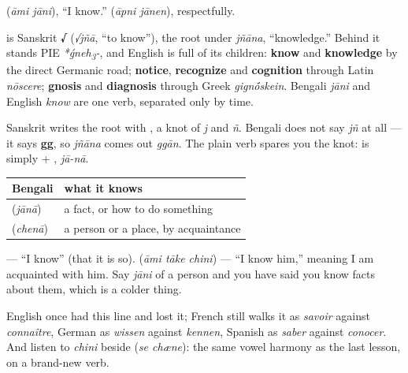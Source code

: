   (\emph{āmi jāni}), \textquotedblleft{}I know.\textquotedblright{}   (\emph{āpni jānen}), respectfully.

\begin{cousinweb}
\textbf{} is Sanskrit \textbf{√} (\emph{√jñā}, \textquotedblleft{}to know\textquotedblright{}), the root under \emph{jñāna}, \textquotedblleft{}knowledge.\textquotedblright{} Behind it stands PIE \emph{*ǵneh\textsubscript{3}-}, and English is full of its children: \textbf{know} and \textbf{knowledge} by the direct Germanic road; \textbf{notice}, \textbf{recognize} and \textbf{cognition} through Latin \emph{nōscere}; \textbf{gnosis} and \textbf{diagnosis} through Greek \emph{gign\'{\={o}}skein}. Bengali \emph{jāni} and English \emph{know} are one verb, separated only by time.
\end{cousinweb}

\begin{sounds}
Sanskrit writes the root with \textbf{}, a knot of \emph{j} and \emph{ñ}. Bengali does not say \emph{jñ} at all — it says \textbf{gg}, so \emph{jñāna} comes out \emph{ggān}. The plain verb spares you the knot: \textbf{} is simply  + , \emph{jā-nā}.
\end{sounds}

\begin{grammarlens}[title={Grammar Lens: two knowings, and English has one word for both}]
\noindent
\begin{tabularx}{\linewidth}{@{}>{\raggedright\arraybackslash}X>{\raggedright\arraybackslash}X@{}}
\toprule
\textbf{Bengali} & \textbf{what it knows} \\
\midrule
\bn{জানা} (\emph{jānā}) & a fact, or how to do something \\
\bn{চেনা} (\emph{chenā}) & a person or a place, by acquaintance \\
\bottomrule
\end{tabularx}

  — \textquotedblleft{}I know\textquotedblright{} (that it is so).    (\emph{āmi tāke chini}) — \textquotedblleft{}I know him,\textquotedblright{} meaning I am acquainted with him. Say \emph{jāni} of a person and you have said you know facts about them, which is a colder thing.

English once had this line and lost it; French still walks it as \emph{savoir} against \emph{connaître}, German as \emph{wissen} against \emph{kennen}, Spanish as \emph{saber} against \emph{conocer}. And listen to \emph{chini} beside   (\emph{se chæne}): the same vowel harmony as the last lesson, on a brand-new verb.
\end{grammarlens}


